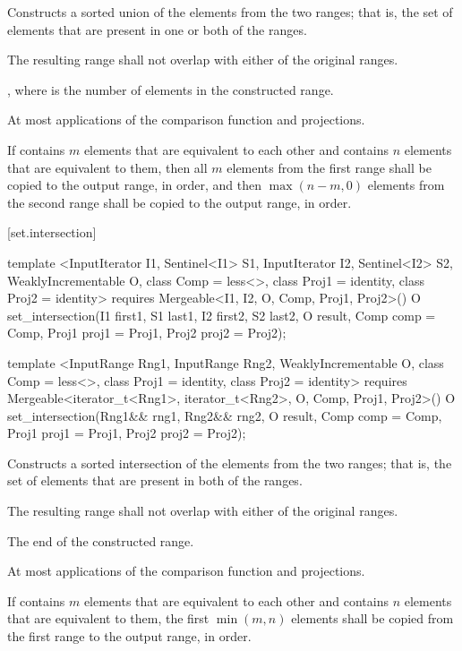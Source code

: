 \begin{itemdescr}
\pnum
\effects
Constructs a sorted union of the elements from the two ranges;
that is, the set of elements that are present in one or both of the ranges.

\pnum
\requires
The resulting range shall not overlap with either of the original ranges.

\pnum
\returns
{}, where  is
the number of elements in the constructed range.

\pnum
\complexity
At most
applications of the comparison function and projections.

\pnum
\notes If  contains $m$ elements that are equivalent to
each other and  contains $n$ elements that are equivalent
to them, then all $m$ elements from the first range shall be copied to the output
range, in order, and then $\max(n - m, 0)$ elements from the second range shall
be copied to the output range, in order.
\end{itemdescr}

[set.intersection]{}

%
\begin{itemdecl}
template <InputIterator I1, Sentinel<I1> S1, InputIterator I2, Sentinel<I2> S2,
    WeaklyIncrementable O, class Comp = less<>, class Proj1 = identity, class Proj2 = identity>
  requires Mergeable<I1, I2, O, Comp, Proj1, Proj2>()
  O
    set_intersection(I1 first1, S1 last1, I2 first2, S2 last2, O result,
                     Comp comp = Comp{}, Proj1 proj1 = Proj1{}, Proj2 proj2 = Proj2{});

template <InputRange Rng1, InputRange Rng2, WeaklyIncrementable O,
    class Comp = less<>, class Proj1 = identity, class Proj2 = identity>
  requires Mergeable<iterator_t<Rng1>, iterator_t<Rng2>, O, Comp, Proj1, Proj2>()
  O
    set_intersection(Rng1&& rng1, Rng2&& rng2, O result,
                     Comp comp = Comp{}, Proj1 proj1 = Proj1{}, Proj2 proj2 = Proj2{});
\end{itemdecl}

\begin{itemdescr}
\pnum
\effects
Constructs a sorted intersection of the elements from the two ranges;
that is, the set of elements that are present in both of the ranges.

\pnum
\requires
The resulting range shall not overlap with either of the original ranges.

\pnum
\returns
The end of the constructed range.

\pnum
\complexity
At most
applications of the comparison function and projections.

\pnum
\notes If  contains $m$ elements that are equivalent to
each other and  contains $n$ elements that are equivalent
to them, the first $\min(m, n)$ elements shall be copied from the first range
to the output range, in order.
\end{itemdescr}

